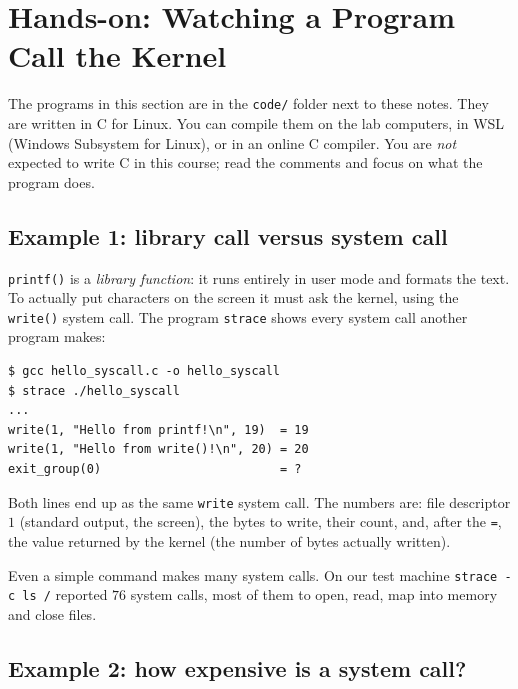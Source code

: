 \documentclass[11pt,a4paper]{article}
\newcommand{\cmd}[1]{\texttt{#1}}
\begin{document}
\section{Hands-on: Watching a Program Call the Kernel}
\label{sec:syscall}

The programs in this section are in the \texttt{code/} folder next to these notes. They are written in C for Linux. You can compile them on the lab computers, in WSL (Windows Subsystem for Linux), or in an online C compiler. You are \emph{not} expected to write C in this course; read the comments and focus on what the program does.

\subsection{Example 1: library call versus system call}



\cmd{printf()} is a \emph{library function}: it runs entirely in user mode and formats the text. To actually put characters on the screen it must ask the kernel, using the \cmd{write()} system call. The program \cmd{strace} shows every system call another program makes:

\begin{lstlisting}[style=term]
$ gcc hello_syscall.c -o hello_syscall
$ strace ./hello_syscall
...
write(1, "Hello from printf!\n", 19)  = 19
write(1, "Hello from write()!\n", 20) = 20
exit_group(0)                         = ?
\end{lstlisting}

Both lines end up as the same \cmd{write} system call. The numbers are: file descriptor $1$ (standard output, the screen), the bytes to write, their count, and, after the \texttt{=}, the value returned by the kernel (the number of bytes actually written).

Even a simple command makes many system calls. On our test machine \cmd{strace -c ls /} reported $76$ system calls, most of them to open, read, map into memory and close files.

\subsection{Example 2: how expensive is a system call?}


\end{document}
